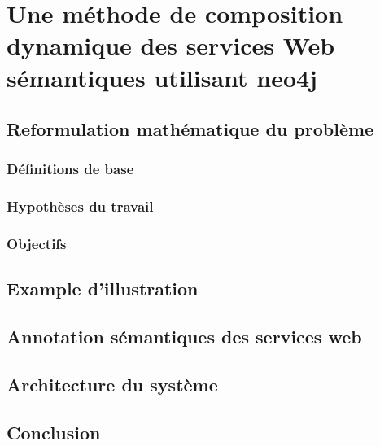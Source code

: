
\chapter{Une méthode de composition dynamique des services Web sémantiques utilisant neo4j}

\section{Reformulation mathématique du problème}
\label{sec:reform-du-probl}
  \subsection{Définitions de base}
  \label{sec:un-formalisme-pour}
  \subsection{Hypothèses du travail}
  \label{sec:hypotese-de-travail}
  \subsection{Objectifs}
  \label{objectifs}
\section{Example d'illustration}
\label{sec:example-dill}

\section{Annotation sémantiques des services web}
\label{sec:annot-semant-des}

\section{Architecture du système}
\label{sec:larch-du-syst}

\section{Conclusion}
\label{sec:conclusion-1}

